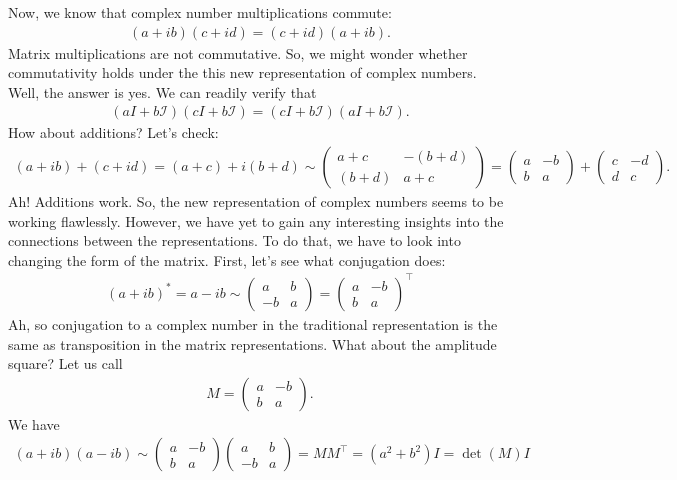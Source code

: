 \documentclass{book}
\theoremstyle{definition}
\begin{document}
Now, we know that complex number multiplications commute:
\begin{align*}
(a+ib)(c+id) = (c+id)(a+ib).
\end{align*}
Matrix multiplications are not commutative. So, we might wonder whether commutativity holds under the this new representation of complex numbers. Well, the answer is yes. We can readily verify that
\begin{align*}
(aI+b\mathcal{I})(cI+b\mathcal{I}) = (cI+b\mathcal{I})(aI+b\mathcal{I}).
\end{align*}
How about additions? Let's check:
\begin{align*}
(a + ib) + (c+ id) = (a+c) + i(b+d) \sim \begin{pmatrix}
a+c & -(b+d)\\
(b+d) & a+c 
\end{pmatrix}=
\begin{pmatrix}
a & -b\\
b & a
\end{pmatrix}+
\begin{pmatrix}
c & -d\\
d & c
\end{pmatrix}.
\end{align*}
Ah! Additions work. So, the new representation of complex numbers seems to be working flawlessly. However, we have yet to gain any interesting insights into the connections between the representations. To do that, we have to look into changing the form of the matrix. First, let's see what conjugation does:
\begin{align*}
(a+ib)^* = a-ib \sim \begin{pmatrix}
a & b \\
-b & a
\end{pmatrix}
=
\begin{pmatrix}
a & -b\\
b & a
\end{pmatrix}^{\top}
\end{align*}
Ah, so conjugation to a complex number in the traditional representation is the same as transposition in the matrix representations. What about the amplitude square? Let us call 
\begin{align*}
M = \begin{pmatrix}
a & -b \\
b & a
\end{pmatrix}.
\end{align*}
We have
\begin{align*}
(a+ib)(a-ib) \sim \begin{pmatrix}
a & -b\\
b & a
\end{pmatrix}
\begin{pmatrix}
a & b \\
-b & a
\end{pmatrix} =
MM^\top= (a^2+b^2)I = \det(M)I
\end{align*}
\end{document}
